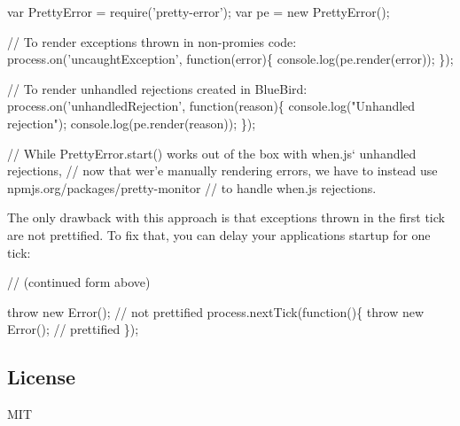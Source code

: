 \begin{DoxyCode}
var PrettyError = require('pretty-error');
var pe = new PrettyError();

// To render exceptions thrown in non-promies code:
process.on('uncaughtException', function(error)\{
   console.log(pe.render(error));
\});

// To render unhandled rejections created in BlueBird:
process.on('unhandledRejection', function(reason)\{
   console.log("Unhandled rejection");
   console.log(pe.render(reason));
\});

// While PrettyError.start() works out of the box with when.js` unhandled rejections,
// now that wer'e manually rendering errors, we have to instead use npmjs.org/packages/pretty-monitor
// to handle when.js rejections.
\end{DoxyCode}


The only drawback with this approach is that exceptions thrown in the first tick are not prettified. To fix that, you can delay your application\textquotesingle{}s startup for one tick\+:


\begin{DoxyCode}
// (continued form above)

throw new Error(); // not prettified
process.nextTick(function()\{
   throw new Error(); // prettified
\});
\end{DoxyCode}


\subsection*{License}

M\+IT 